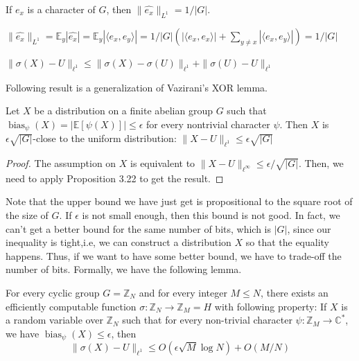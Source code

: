 \begin{fact}
If $e_x$ is a character of $G$, then $\| \widehat{e_x} \|_{L^1} = 1 / |G|$.
\end{fact}
$\| \widehat{e_x} \|_{L^1} = \mathbb{E}_y |\widehat{e_x}| 
= \mathbb{E}_y |\langle e_x , e_y \rangle| = 1/|G| (|\langle e_x, e_x \rangle| 
+ \sum\limits_{y \neq x} |\langle e_x, e_y \rangle|) = 1/|G|$

\begin{fact}
$\| \sigma(X) - U \|_{\ell^1} \leq \| \sigma(X) - \sigma(U) \|_{\ell^1} + \| \sigma(U) - U \|_{\ell^1} $
\end{fact}

Following result is a generalization of Vazirani's XOR lemma.
\begin{lemma}
Let $X$ be a distribution on a finite abelian group $G$ such that $\operatorname{bias}_\psi(X) = |\mathbb{E}[\psi (X)] | \leq \epsilon$ for every nontrivial character $\psi$. Then $X$ is $\epsilon \sqrt{|G|}$-close to the uniform distribution: $\| X - U \|_{\ell^1} \leq \epsilon \sqrt{|G|}$
\end{lemma}

\begin{proof}
The assumption on $X$ is equivalent to $\|X - U \|_{\ell^\infty} \leq \epsilon/\sqrt{|G|}$. Then, we need to apply Proposition 3.22 to get the result.
\end{proof}

Note that the upper bound we have just get is propositional to the square root of the size of $G$. If $\epsilon$ is not small enough, then this bound is not good. In fact, we can't get a better bound for the same number of bits, which is $|G|$, since our inequality is tight,i.e, we can construct a distribution $X$ so that the equality happens. Thus, if we want to have some better bound, we have to trade-off the number of bits. Formally, we have the following lemma. 

\begin{lemma}
For every cyclic group $G = \mathbb{Z}_N$ and for every integer $M \leq N$, there exists an efficiently computable function $\sigma : \mathbb{Z}_N \rightarrow \mathbb{Z}_M = H$ with following property: If $X$ is a random variable over $\mathbb{Z}_N$ such that for every non-trivial character $\psi : \mathbb{Z}_M \rightarrow \mathbb{C}^*$, we have $\operatorname{bias}_{\psi}(X) \leq \epsilon$, then 
$$\| \sigma(X) - U \|_{\ell^1} \leq O(\epsilon \sqrt{M} \log N) + O(M/N)$$
\end{lemma}

